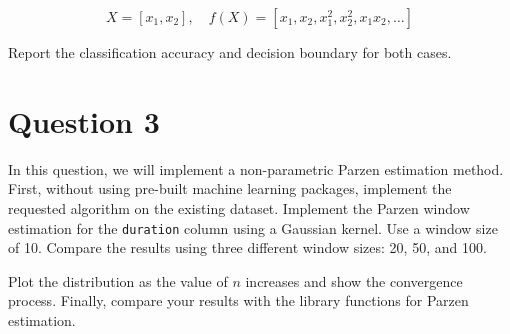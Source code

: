 \documentclass[12pt]{article}
\newcommand{\proof}[1]{
{\noindent {\it Proof.} {#1} \rule{2mm}{2mm} \vskip \belowdisplayskip}
}
\newtheorem{theorem}[lemma]{Theorem}
\begin{document}
\[
X = [x_1, x_2], \quad f(X) = [x_1, x_2, x_1^2, x_2^2, x_1x_2, \dots]
\]

Report the classification accuracy and decision boundary for both cases.

\section*{Question 3}

In this question, we will implement a non-parametric Parzen estimation method. First, without using pre-built machine 
learning packages, implement the requested algorithm on the existing dataset. Implement the Parzen window estimation 
for the \texttt{duration} column using a Gaussian kernel. Use a window size of 10. Compare the results using three 
different window sizes: 20, 50, and 100.

Plot the distribution as the value of $n$ increases and show the convergence process. Finally, compare your results with 
the library functions for Parzen estimation.


\end{document}
